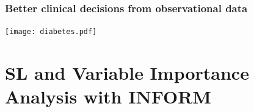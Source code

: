 \documentclass[t]{beamer}
\begin{document}
\begin{frame}
\frametitle{Better clinical decisions from observational data}
\vspace{-20pt}
\begin{center}
  \texttt{[image: diabetes.pdf]}
  \end{center}
\end{frame}



\section{SL and Variable Importance Analysis with INFORM}
\end{document}
